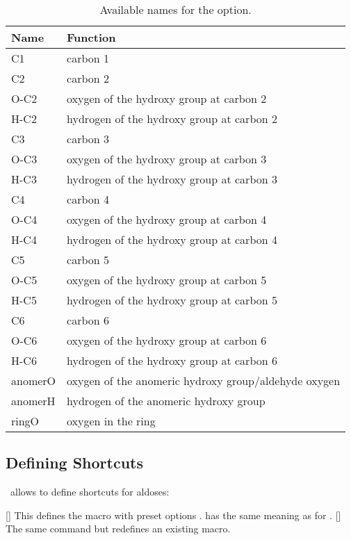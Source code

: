 \documentclass[load-preamble+]{cnltx-doc}
\begin{document}
\begin{table}[htb]
  \centering
  \caption{Available names for the  option.}\label{tab:color}
  \begin{tabular}{>{\ttfamily}ll}
    \toprule
      \rmfamily\bfseries Name & \bfseries Function \\
    \midrule
      C1 & carbon 1 \\
      C2 & carbon 2 \\
      O-C2 & oxygen of the hydroxy group at carbon 2 \\
      H-C2 & hydrogen of the hydroxy group at carbon 2 \\
      C3 & carbon 3 \\
      O-C3 & oxygen of the hydroxy group at carbon 3 \\
      H-C3 & hydrogen of the hydroxy group at carbon 3 \\
      C4 & carbon 4 \\
      O-C4 & oxygen of the hydroxy group at carbon 4 \\
      H-C4 & hydrogen of the hydroxy group at carbon 4 \\
      C5 & carbon 5 \\
      O-C5 & oxygen of the hydroxy group at carbon 5 \\
      H-C5 & hydrogen of the hydroxy group at carbon 5 \\
      C6 & carbon 6 \\
      O-C6 & oxygen of the hydroxy group at carbon 6 \\
      H-C6 & hydrogen of the hydroxy group at carbon 6 \\
      anomerO & oxygen of the anomeric hydroxy group\slash aldehyde oxygen \\
      anomerH & hydrogen of the anomeric hydroxy group \\
      ringO & oxygen in the ring \\
    \bottomrule
  \end{tabular}
\end{table}

\subsection{Defining Shortcuts}\label{sec:defining-shortcuts}

\carbohydrates\ allows to define shortcuts for aldoses:

\begin{commands}
  []
    This defines the macro  with preset options .
     has the same meaning as for .
  []
    The same command but redefines an existing macro.
\end{commands}
\end{document}
